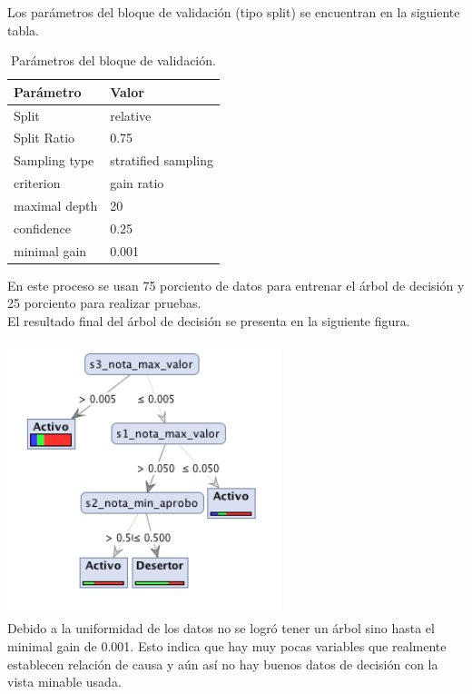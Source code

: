 \documentclass[fleqn,10pt]{SelfArx} %
\begin{document}
Los parámetros del bloque de validación (tipo split) se encuentran en la siguiente tabla. 

\begin{table}[htbp]
\begin{center}
\begin{tabular}{|l|l|}
\hline
Parámetro & Valor \\
\hline \hline
Split & relative \\ \hline
Split Ratio & 0.75 \\ \hline
Sampling type & stratified sampling  \\ \hline
criterion & gain ratio  \\ \hline
maximal depth & 20  \\ \hline
confidence & 0.25  \\ \hline
minimal gain & 0.001  \\ \hline
\end{tabular}
\caption{Parámetros del bloque de validación.}
\label{tabla:sencilla}
\end{center}
\end{table}

En este proceso se usan 75 porciento de datos para entrenar el árbol de decisión y 25 porciento para realizar pruebas.\\

El resultado final del árbol de decisión se presenta en la siguiente figura. 

\includegraphics[width=8cm]{img/tree3.png} \\ 

Debido a la uniformidad de los datos no se logró tener un árbol sino hasta el minimal gain de 0.001. Esto indica que hay muy pocas variables que realmente establecen relación de causa y aún así no hay buenos datos de decisión con la vista minable usada.\\
\end{document}
